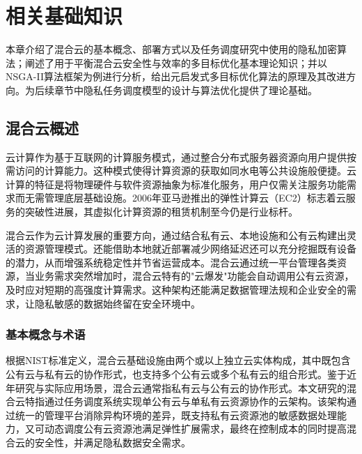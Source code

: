 \chapter{相关基础知识}\label{chapter:theories}

本章介绍了混合云的基本概念、部署方式以及任务调度研究中使用的隐私加密算法；阐述了用于平衡混合云安全性与效率的多目标优化基本理论知识；并以NSGA-II算法框架为例进行分析，给出元启发式多目标优化算法的原理及其改进方向。为后续章节中隐私任务调度模型的设计与算法优化提供了理论基础。

\section{混合云概述}

云计算作为基于互联网的计算服务模式，通过整合分布式服务器资源向用户提供按需访问的计算能力。这种模式使得计算资源的获取如同水电等公共设施般便捷。云计算的特征是将物理硬件与软件资源抽象为标准化服务，用户仅需关注服务功能需求而无需管理底层基础设施。2006年亚马逊推出的弹性计算云（EC2）标志着云服务的突破性进展，其虚拟化计算资源的租赁机制至今仍是行业标杆。

混合云作为云计算发展的重要方向，通过结合私有云、本地设施和公有云构建出灵活的资源管理模式。还能借助本地就近部署减少网络延迟还可以充分挖掘既有设备的潜力，从而增强系统稳定性并节省运营成本。混合云通过统一平台管理各类资源，当业务需求突然增加时，混合云特有的"云爆发"功能会自动调用公有云资源，及时应对短期的高强度计算需求。这种架构还能满足数据管理法规和企业安全的需求，让隐私敏感的数据始终留在安全环境中。

\subsection{基本概念与术语}

根据NIST标准定义，混合云基础设施由两个或以上独立云实体构成，其中既包含公有云与私有云的协作形式，也支持多个公有云或多个私有云的组合形式。鉴于近年研究与实际应用场景，混合云通常指私有云与公有云的协作形式。本文研究的混合云特指通过任务调度系统实现单公有云与单私有云资源协作的云架构。该架构通过统一的管理平台消除异构环境的差异，既支持私有云资源池的敏感数据处理能力，又可动态调度公有云资源池满足弹性扩展需求，最终在控制成本的同时提高混合云的安全性，并满足隐私数据安全需求。

